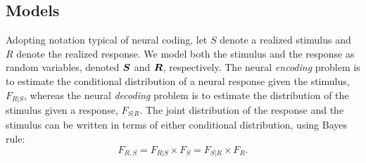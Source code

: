 \documentclass[11pt]{article}
\begin{document}









\subsection{Models}





Adopting notation typical of neural coding, let $S$ denote a realized stimulus  and $R$ denote the realized response.   
We model both the stimulus and the response as random variables, denoted $\boldsymbol{S}$ and $\boldsymbol{R}$, respectively.
The neural \emph{encoding} problem is to estimate the conditional distribution of a neural response given the stimulus, $F_{R | S}$, whereas the neural \emph{decoding} problem is to estimate the distribution of the stimulus given a response, $F_{S | R}$. The joint distribution of the response and the stimulus can be written in terms of either conditional distribution, using Bayes rule: 
\begin{equation}
F_{R,S} = F_{R|S} \times F_S = F_{S| R}\times F_R.
\end{equation}

\end{document}
